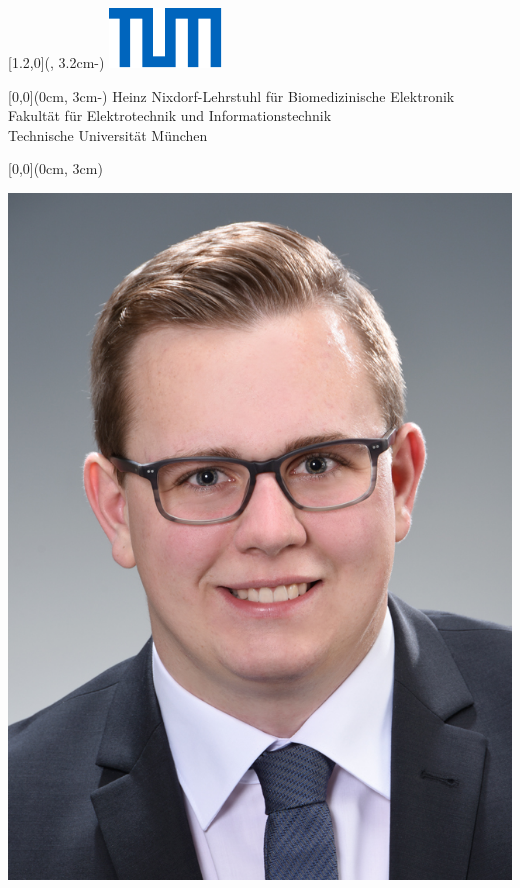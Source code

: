 \thispagestyle{empty}
\begin{textblock*}{\UniversitaetLogoBreite}[1.2,0](\textwidth, 3.2cm-\SeitenrandOben)%
	\raggedleft\includegraphics{./Ressources/Universitaet_Logo_RGB.pdf}%
\end{textblock*}
	
\begin{textblock*}{\textwidth}[0,0](0cm, 3cm-\SeitenrandOben)%
	\textcolor{TUMblau}{Heinz Nixdorf-Lehrstuhl für Biomedizinische Elektronik\\
	Fakultät für Elektrotechnik und Informationstechnik\\
	Technische Universität München}
\end{textblock*}
	
	
\begin{textblock*}{\textwidth}[0,0](0cm, 3cm)%
	{\fontsize{24pt}{26pt}\selectfont\textbf{\Titel}}
	
		
	\vspace*{14pt}
	\begin{center}
	\includegraphics[clip,height=\FotoStudentHoehe, keepaspectratio] 
	{./Ressources/FotoStudent.jpg}
	\end{center}
		
\end{textblock*}	
	
